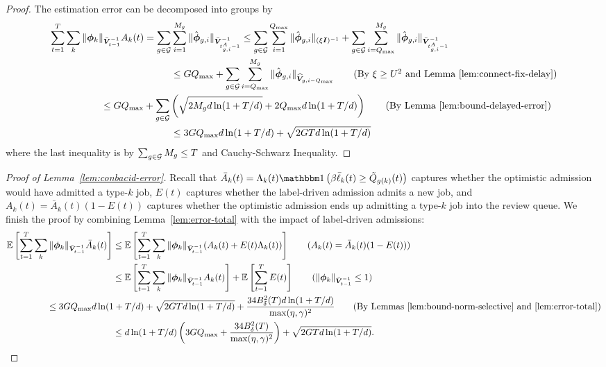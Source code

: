 \begin{proof}
The estimation error can be decomposed into groups by 
\begin{align*}
\sum_{t=1}^T \sum_k
\|\bphi_k\|_{\bar{\bV}_{t-1}^{-1}}A_k(t) = \sum_{g \in \set{G}} \sum_{i=1}^{M_g} \|\hat{\bphi}_{g,i}\|_{\bar{\bV}_{t_{g,i}^A - 1}^{-1}} &\leq  \sum_{g\in\set{G}} \sum_{i=1}^{Q_{\max}}  \|\hat{\bphi}_{g,i}\|_{(\xi \bI)^{-1}} + \sum_{g \in \set{G}} \sum_{i=Q_{\max}}^{M_g} \|\hat{\bphi}_{g,i}\|_{\bar{\bV}_{t_{g,i}^A - 1}^{-1}} \\
&\hspace{-1in}\leq GQ_{\max} + \sum_{g \in \set{G}} \sum_{i=Q_{\max}}^{M_g} \|\hat{\bphi}_{g,i}\|_{\widehat{\bV}_{g,i-Q_{\max}}} \tag{By $\xi \geq U^2$ and Lemma~\ref{lem:connect-fix-delay}} \\
&\hspace{-2in}\leq GQ_{\max} + \sum_{g\in\set{G}}\left(\sqrt{2M_gd\ln(1+T/d)}+2Q_{\max}d\ln(1+T/d)\right) \tag{By Lemma~\ref{lem:bound-delayed-error}} \\
&\hspace{-1in}\leq 3GQ_{\max}d\ln(1+T/d) + \sqrt{2GTd\ln(1+T/d)}
\end{align*}
where the last inequality is by $\sum_{g \in \mathcal{G}} M_g \leq T$ and Cauchy-Schwarz Inequality.
\end{proof}

\begin{proof}[Proof of Lemma~\ref{lem:conbacid-error}]
Recall that $\bar{A}_k(t) = \Lambda_k(t)\indic{\beta \bar{\ell}_k(t) \geq \tilde{Q}_{g(k)}(t)}$ captures whether the optimistic admission would have admitted a type-$k$ job, $E(t)$ captures whether the label-driven admission admits a new job, and $A_k(t) = \bar{A}_k(t)(1-E(t))$ captures whether the optimistic admission ends up admitting a type-$k$ job into the review queue. We finish the proof by combining Lemma~\ref{lem:error-total} with the impact of label-driven admissions:
\begin{align*}
\expect{\sum_{t=1}^T \sum_k \|\bphi_k\|_{\bar{\bV}_{t-1}^{-1}}\bar{A}_k(t)} &\leq 
\expect{\sum_{t=1}^T \sum_k \|\bphi_k\|_{\bar{\bV}_{t-1}^{-1}} (A_k(t) + E(t)\Lambda_k(t))} \tag{$A_k(t) = \bar{A}_k(t)(1-E(t))$} \\
&\leq \expect{\sum_{t=1}^T \sum_k \|\bphi_k\|_{\bar{\bV}_{t-1}^{-1}} A_k(t)} + \expect{\sum_{t=1}^T E(t)} \tag{$\|\bphi_k\|_{\bar{\bV}_{t-1}^{-1}} \leq 1$} \\
&\hspace{-1in}\leq 3GQ_{\max}d\ln(1+T/d) + \sqrt{2GTd\ln(1+T/d)} + \frac{34B_{\delta}^2(T)d\ln(1+T/d)}{\max(\eta,\gamma)^2} \tag{By Lemmas~\ref{lem:bound-norm-selective} and \ref{lem:error-total}}  \\
&\leq d\ln(1+T/d)\left(3G Q_{\max} + \frac{34B_{\delta}^2(T)}{\max(\eta,\gamma)^2}\right) + \sqrt{2GTd\ln(1+T/d)}.
\end{align*} 
\end{proof}
